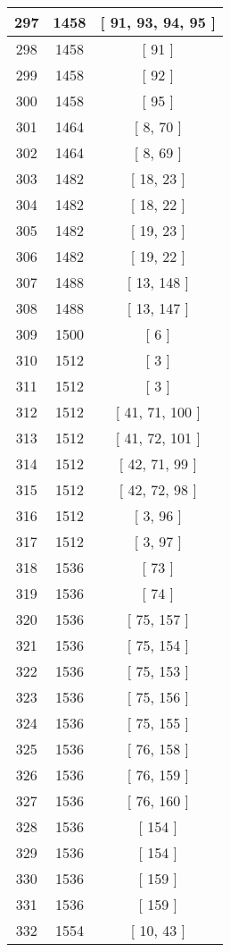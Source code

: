 \begin{center}
\begin{longtable}[H]{|| c c c ||}
297 & 1458 & [ 91, 93, 94, 95 ]
\\\hline
298 & 1458 & [ 91 ]
\\\hline
299 & 1458 & [ 92 ]
\\\hline
300 & 1458 & [ 95 ]
\\\hline
301 & 1464 & [ 8, 70 ]
\\\hline
302 & 1464 & [ 8, 69 ]
\\\hline
303 & 1482 & [ 18, 23 ]
\\\hline
304 & 1482 & [ 18, 22 ]
\\\hline
305 & 1482 & [ 19, 23 ]
\\\hline
306 & 1482 & [ 19, 22 ]
\\\hline
307 & 1488 & [ 13, 148 ]
\\\hline
308 & 1488 & [ 13, 147 ]
\\\hline
309 & 1500 & [ 6 ]
\\\hline
310 & 1512 & [ 3 ]
\\\hline
311 & 1512 & [ 3 ]
\\\hline
312 & 1512 & [ 41, 71, 100 ]
\\\hline
313 & 1512 & [ 41, 72, 101 ]
\\\hline
314 & 1512 & [ 42, 71, 99 ]
\\\hline
315 & 1512 & [ 42, 72, 98 ]
\\\hline
316 & 1512 & [ 3, 96 ]
\\\hline
317 & 1512 & [ 3, 97 ]
\\\hline
318 & 1536 & [ 73 ]
\\\hline
319 & 1536 & [ 74 ]
\\\hline
320 & 1536 & [ 75, 157 ]
\\\hline
321 & 1536 & [ 75, 154 ]
\\\hline
322 & 1536 & [ 75, 153 ]
\\\hline
323 & 1536 & [ 75, 156 ]
\\\hline
324 & 1536 & [ 75, 155 ]
\\\hline
325 & 1536 & [ 76, 158 ]
\\\hline
326 & 1536 & [ 76, 159 ]
\\\hline
327 & 1536 & [ 76, 160 ]
\\\hline
328 & 1536 & [ 154 ]
\\\hline
329 & 1536 & [ 154 ]
\\\hline
330 & 1536 & [ 159 ]
\\\hline
331 & 1536 & [ 159 ]
\\\hline
332 & 1554 & [ 10, 43 ]
\\\hline

\end{longtable}
\end{center}
